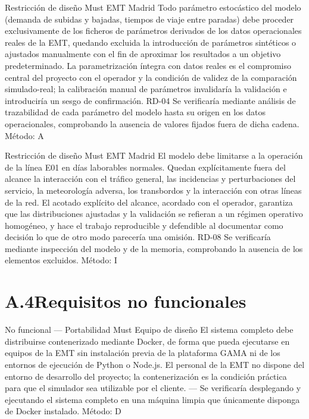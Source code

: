 {Restricción de diseño}
{Must}
{EMT Madrid}
{Todo parámetro estocástico del modelo (demanda de subidas y bajadas, tiempos de viaje entre paradas) debe
proceder exclusivamente de los ficheros de parámetros derivados de los datos operacionales reales de la EMT,
quedando excluida la introducción de parámetros sintéticos o ajustados manualmente con el fin de aproximar los
resultados a un objetivo predeterminado.}
{La parametrización íntegra con datos reales es el compromiso central del proyecto con el operador y la condición
de validez de la comparación simulado-real; la calibración manual de parámetros invalidaría la validación e
introduciría un sesgo de confirmación.}
{RD-04}
{Se verificaría mediante análisis de trazabilidad de cada parámetro del modelo hasta su origen en los datos
operacionales, comprobando la ausencia de valores fijados fuera de dicha cadena. Método: A}

{Restricción de diseño}
{Must}
{EMT Madrid}
{El modelo debe limitarse a la operación de la línea E01 en días laborables normales. Quedan explícitamente
fuera del alcance la interacción con el tráfico general, las incidencias y perturbaciones del servicio, la
meteorología adversa, los transbordos y la interacción con otras líneas de la red.}
{El acotado explícito del alcance, acordado con el operador, garantiza que las distribuciones ajustadas y la
validación se refieran a un régimen operativo homogéneo, y hace el trabajo reproducible y defendible al documentar
como decisión lo que de otro modo parecería una omisión.}
{RD-08}
{Se verificaría mediante inspección del modelo y de la memoria, comprobando la ausencia de los elementos excluidos.
Método: I}

\section*{A.4\quad Requisitos no funcionales}

{No funcional --- Portabilidad}
{Must}
{Equipo de diseño}
{El sistema completo debe distribuirse contenerizado mediante Docker, de forma que pueda ejecutarse en equipos de
la EMT sin instalación previa de la plataforma GAMA ni de los entornos de ejecución de Python o Node.js.}
{El personal de la EMT no dispone del entorno de desarrollo del proyecto; la contenerización es la condición
práctica para que el simulador sea utilizable por el cliente.}
{---}
{Se verificaría desplegando y ejecutando el sistema completo en una máquina limpia que únicamente disponga de
Docker instalado. Método: D}

